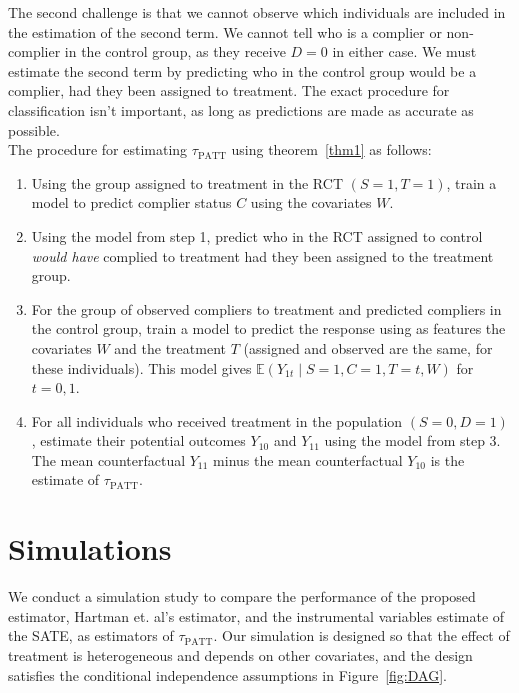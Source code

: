 \documentclass[12pt]{article}
\newcommand{\ex}{\mathbb{E}} %
\begin{document}
The second challenge is that we cannot observe which individuals are included in the estimation of the second term. We cannot tell who is a complier or non-complier in the control group, as they receive $D=0$ in either case.  We must estimate the second term by predicting who in the control group would be a complier, had they been assigned to treatment.  The exact procedure for classification isn't important, as long as predictions are made as accurate as possible. \\

The procedure for estimating $\tau_{\text{PATT}}$ using theorem~\ref{thm1} as follows:
\begin{enumerate}
\item Using the group assigned to treatment in the RCT $(S=1, T=1)$, train a model to predict complier status $C$ using the covariates $W$.
\item Using the model from step 1, predict who in the RCT assigned to control \textit{would have} complied to treatment had they been assigned to the treatment group.
\item For the group of observed compliers to treatment and predicted compliers in the control group, train a model to predict the response using as features the covariates $W$ and the treatment $T$ (assigned and observed are the same, for these individuals).  This model gives $\ex(Y_{1t} \mid S=1, C=1, T=t, W)$ for $t = 0,1$.
\item For all individuals who received treatment in the population $(S=0, D=1)$, estimate their potential outcomes $Y_{10}$ and $Y_{11}$ using the model from step 3.  The mean counterfactual $Y_{11}$ minus the mean counterfactual $Y_{10}$ is the estimate of $\tau_{\text{PATT}}$.
\end{enumerate}




\section{Simulations}
We conduct a simulation study to compare the performance of the proposed estimator, Hartman et. al's estimator, and the instrumental variables estimate of the SATE, as estimators of $\tau_{\text{PATT}}$.  Our simulation is designed so that the effect of treatment is heterogeneous and depends on other covariates, and the design satisfies the conditional independence assumptions in Figure~\ref{fig:DAG}.
\end{document}
